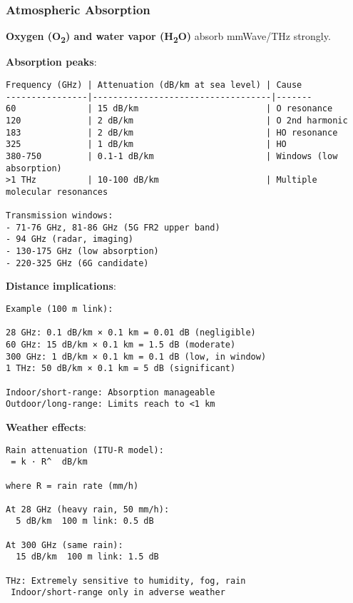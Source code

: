 \subsubsection{Atmospheric Absorption}\label{atmospheric-absorption}

\textbf{Oxygen (O\textsubscript{2}) and water vapor
(H\textsubscript{2}O)} absorb mmWave/THz strongly.

\textbf{Absorption peaks}:

\begin{verbatim}
Frequency (GHz) | Attenuation (dB/km at sea level) | Cause
----------------|-----------------------------------|-------
60              | 15 dB/km                         | O resonance
120             | 2 dB/km                          | O 2nd harmonic
183             | 2 dB/km                          | HO resonance
325             | 1 dB/km                          | HO
380-750         | 0.1-1 dB/km                      | Windows (low absorption)
>1 THz          | 10-100 dB/km                     | Multiple molecular resonances

Transmission windows:
- 71-76 GHz, 81-86 GHz (5G FR2 upper band)
- 94 GHz (radar, imaging)
- 130-175 GHz (low absorption)
- 220-325 GHz (6G candidate)
\end{verbatim}

\textbf{Distance implications}:

\begin{verbatim}
Example (100 m link):

28 GHz: 0.1 dB/km × 0.1 km = 0.01 dB (negligible)
60 GHz: 15 dB/km × 0.1 km = 1.5 dB (moderate)
300 GHz: 1 dB/km × 0.1 km = 0.1 dB (low, in window)
1 THz: 50 dB/km × 0.1 km = 5 dB (significant)

Indoor/short-range: Absorption manageable
Outdoor/long-range: Limits reach to <1 km
\end{verbatim}

\textbf{Weather effects}:

\begin{verbatim}
Rain attenuation (ITU-R model):
 = k · R^  dB/km

where R = rain rate (mm/h)

At 28 GHz (heavy rain, 50 mm/h):
  5 dB/km  100 m link: 0.5 dB

At 300 GHz (same rain):
  15 dB/km  100 m link: 1.5 dB

THz: Extremely sensitive to humidity, fog, rain
 Indoor/short-range only in adverse weather
\end{verbatim}

